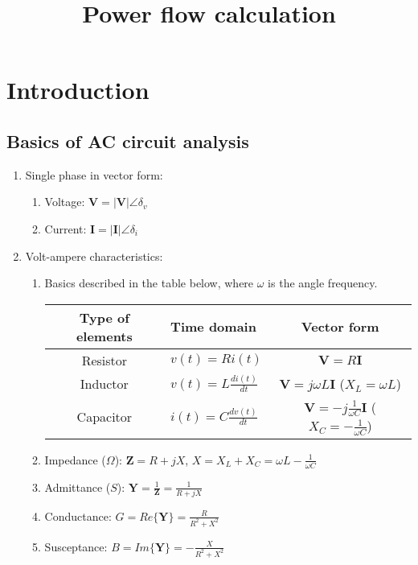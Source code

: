 \documentclass[journal,12pt,onecolumn,draftclsnofoot]{IEEEtran}
\newcommand{\V}{\boldsymbol{V}}
\newcommand{\I}{\boldsymbol{I}}
\newcommand{\Z}{\boldsymbol{Z}}
\newcommand{\Y}{\boldsymbol{Y}}
\theoremstyle{definition}
\begin{document}
\title{Power flow calculation}
\maketitle
\section{Introduction}
\subsection{Basics of AC circuit analysis}
\begin{enumerate}
\item Single phase in vector form:
\begin{enumerate}
\item Voltage: $\V = |\V|\angle\delta_{v}$
\item Current: $\I = |\I|\angle\delta_{i}$
\end{enumerate}

\item Volt-ampere characteristics:
\begin{enumerate}
\item Basics described in the table below, where $\omega$ is the angle frequency.
\begin{table}[h]
\renewcommand{\arraystretch}{1.3}
\label{VA}
\centering
\begin{tabular}{clc}
\hline
\bfseries Type of elements & \bfseries Time domain & \bfseries Vector form \\
\hline
Resistor & $v(t) = Ri(t)$ & $\V = R\I$\\
Inductor & $v(t) = L\frac{di(t)}{dt}$ & $\V = j\omega L\I$ ($X_L = \omega L$)\\
Capacitor & $i(t) = C\frac{dv(t)}{dt}$ & $\V = -j\frac1{\omega C}\I$ ($X_C = -\frac1{\omega C}$)\\
\hline
\end{tabular}
\end{table}
\item Impedance ($\Omega$): $\Z = R + jX$, $X = X_L + X_C = \omega L-\frac1{\omega C}$
\item Admittance ($S$): $\Y = \frac1{\Z} = \frac1{R + jX}$
\item Conductance: $G = Re\{\Y\} = \frac R{R^2+X^2}$
\item Susceptance: $B = Im\{\Y\} = -\frac X{R^2+X^2}$
\end{enumerate}


\end{enumerate}
\end{document}
